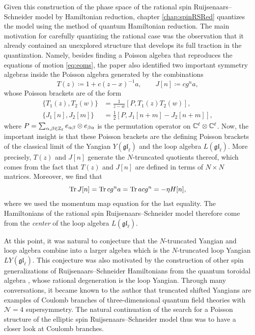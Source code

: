 Given this construction of the phase space of the rational spin Ruijsenaars--Schneider model by Hamiltonian reduction, chapter \ref{chap:spinRSRed} quantizes the model using the method of quantum Hamiltonian reduction. The main motivation for carefully quantizing the rational case was the observation that it already contained an unexplored structure that develops its full traction in the quantization. Namely, besides finding a Poisson algebra that reproduces the equations of motion \eqref{eq:eoms}, the paper \cite{arutyunov_hamiltonian_1998} also identified two important symmetry algebras inside the Poisson algebra generated by the combinations
\begin{equation}
	T(z) \coloneq 1 + c (z-x)^{-1} a, \qquad J[n] \coloneq c g^n a,
\end{equation}
whose Poisson brackets are of the form
\begin{align}
	\{ T_1(z),T_2(w) \} &= \frac{1}{z-w} [P,T_1(z) T_2(w)], \\
	\{ J_1[n],J_2[m] \} &= \frac{1}{2} [P,J_1[n+m]-J_2[n+m]],
\end{align}
where $P = \sum_{\alpha,\beta \in \mathbb{Z}_\ell} e_{\alpha\beta} \otimes e_{\beta\alpha}$ is the permutation operator on $\mathbb{C}^\ell \otimes \mathbb{C}^\ell$. Now, the important insight is that these Poisson brackets are the defining Poisson brackets of the classical limit of the Yangian $Y(\mathfrak{gl}_\ell)$ and the loop algebra $L(\mathfrak{gl}_\ell)$. More precisely, $T(z)$ and $J[n]$ generate the $N$-truncated quotients thereof, which comes from the fact that $T(z)$ and $J[n]$ are defined in terms of $N \times N$ matrices. Moreover, we find that
\begin{equation}\label{eq:HamFromCurrent}
	\operatorname{Tr} J[n] = \operatorname{Tr} c g^n a = \operatorname{Tr} ac g^n = -\eta H[n],
\end{equation}
where we used the momentum map equation for the last equality. The Hamiltonians of the rational spin Ruijsenaars--Schneider model therefore come from the \emph{center} of the loop algebra $L(\mathfrak{gl}_\ell)$.

At this point, it was natural to conjecture that the $N$-truncated Yangian and loop algebra combine into a larger algebra which is the $N$-truncated loop Yangian $LY(\mathfrak{gl}_\ell)$. This conjecture was also motivated by the construction of other spin generalizations of Ruijsenaars--Schneider Hamiltonians from the quantum toroidal algebra \cite{lamers_spin-ruijsenaars_2022}, whose rational degeneration is the loop Yangian. Through many conversations, it became known to the author that truncated shifted Yangians are examples of Coulomb branches of three-dimensional quantum field theories with $\mathcal{N}=4$ supersymmetry. The natural continuation of the search for a Poisson structure of the elliptic spin Ruijsenaars--Schneider model thus was to have a closer look at Coulomb branches.

